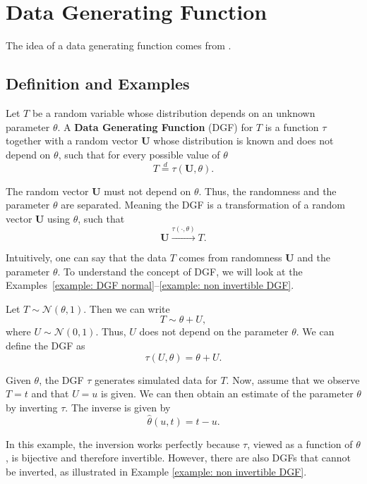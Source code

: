 \chapter{Data Generating Function}

The idea of a data generating function comes from \cite{Lindqvist2025simulated}.

\section{Definition and Examples}

\begin{definition}
	Let $T$ be a random variable whose distribution depends on an unknown
	parameter $\theta$. A \textbf{Data Generating Function} (DGF) for $T$ is a
	function $\tau$ together with a random vector $\mathbf U$ whose distribution
	is known and does not depend on $\theta$, such that for every possible
	value of $\theta$
	\[
	T \overset{d}{=} \tau(\mathbf U, \theta).
	\]
\end{definition}

The random vector $\mathbf{U}$ must not depend on $\theta$. Thus, the randomness and the parameter $\theta$ are separated.
Meaning the DGF is a transformation of a random vector $\mathbf U$ using $\theta$, such that 
\[
\mathbf{U} \overset{\tau(\cdot, \theta)}{\longrightarrow} T.
\]

Intuitively, one can say that the data $T$ comes from randomness $\mathbf U$ and the parameter $\theta$.
To understand the concept of DGF, we will look at the Examples~\ref{example: DGF normal}--\ref{example: non invertible DGF}.

\begin{example} \label{example: DGF normal}
	Let $T \sim \mathcal{N}(\theta, 1)$. Then we can write
	\[
	T \sim \theta + U,
	\]
	where $U \sim \mathcal{N}(0, 1)$. Thus, $U$ does not depend on the parameter $\theta$. We can define the DGF as
	\begin{equation*}
		\tau(U, \theta) = \theta + U.
	\end{equation*}
	
	Given $\theta$, the DGF $\tau$ generates simulated data for $T$. Now, assume that we observe $T = t$ and that $U = u$ is given. We can then obtain an estimate of the parameter $\theta$ by inverting $\tau$.
	The inverse is given by
	\[
	\hat{\theta}(u, t) = t - u.
	\]
	
	In this example, the inversion works perfectly because $\tau$, viewed as a function of $\theta$, is bijective and therefore invertible. However, there are also DGFs that cannot be inverted, as illustrated in Example \ref{example: non invertible DGF}.
\end{example}


